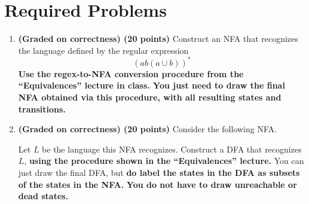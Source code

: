 \documentclass{article}
\theoremstyle{definition}
\newenvironment {solution}
{
\begin{tcolorbox}
}
{
\end{tcolorbox}
}
\begin{document}
\section{Required Problems}
\begin{enumerate}
    \item \textbf{(Graded on correctness) (20 points)} Construct an NFA that recognizes the language defined by the regular expression
    $$(ab(a \cup b))^*$$
    \textbf{Use the regex-to-NFA conversion procedure from the ``Equivalences'' lecture in class. You just need to draw the final NFA obtained via this procedure, with all resulting states and transitions.}

    \begin{solution}
    \end{solution}

    \item \textbf{(Graded on correctness) (20 points)} Consider the following NFA.
    
        
    Let $L$ be the language this NFA recognizes. Construct a DFA that recognizes $L$, \textbf{using the procedure shown in the ``Equivalences'' lecture.} You can just draw the final DFA, but \textbf{do label the states in the DFA as subsets of the states in the NFA.} \textbf{You do not have to draw unreachable or dead states.}


\end{enumerate}
\end{document}

